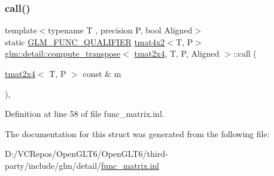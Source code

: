 \subsubsection{\texorpdfstring{call()}{call()}}
{\footnotesize\ttfamily template$<$typename T , precision P, bool Aligned$>$ \\
static \mbox{\hyperlink{setup_8hpp_a33fdea6f91c5f834105f7415e2a64407}{G\+L\+M\+\_\+\+F\+U\+N\+C\+\_\+\+Q\+U\+A\+L\+I\+F\+I\+ER}} \mbox{\hyperlink{structglm_1_1tmat4x2}{tmat4x2}}$<$T, P$>$ \mbox{\hyperlink{structglm_1_1detail_1_1compute__transpose}{glm\+::detail\+::compute\+\_\+transpose}}$<$ \mbox{\hyperlink{structglm_1_1tmat2x4}{tmat2x4}}, T, P, Aligned $>$\+::call (\begin{DoxyParamCaption}\item[{\mbox{\hyperlink{structglm_1_1tmat2x4}{tmat2x4}}$<$ T, P $>$ const \&}]{m }\end{DoxyParamCaption})\hspace{0.3cm}{\ttfamily [inline]}, {\ttfamily [static]}}



Definition at line 58 of file func\+\_\+matrix.\+inl.



The documentation for this struct was generated from the following file\+:\begin{DoxyCompactItemize}
\item 
D\+:/\+V\+C\+Repos/\+Open\+G\+L\+T6/\+Open\+G\+L\+T6/third-\/party/include/glm/detail/\mbox{\hyperlink{func__matrix_8inl}{func\+\_\+matrix.\+inl}}\end{DoxyCompactItemize}
